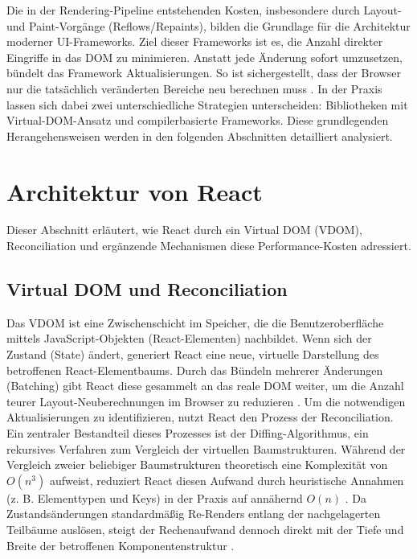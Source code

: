 Die in der Rendering-Pipeline entstehenden Kosten, insbesondere durch Layout- und Paint-Vorgänge (Reflows/Repaints), bilden die Grundlage für die Architektur moderner UI-Frameworks. Ziel dieser Frameworks ist es, die Anzahl direkter Eingriffe in das DOM zu minimieren. Anstatt jede Änderung sofort umzusetzen, bündelt das Framework Aktualisierungen. So ist sichergestellt, dass der Browser nur die tatsächlich veränderten Bereiche neu berechnen muss \cite{kumar-fluentreact-2024}. In der Praxis lassen sich dabei zwei unterschiedliche Strategien unterscheiden: Bibliotheken mit Virtual-DOM-Ansatz und compilerbasierte Frameworks. Diese grundlegenden Herangehensweisen werden in den folgenden Abschnitten detailliert analysiert.

\section{Architektur von React}
\label{s:react}

Dieser Abschnitt erläutert, wie React durch ein Virtual DOM (VDOM), Reconciliation und ergänzende Mechanismen diese Performance-Kosten adressiert.

\subsection{Virtual DOM und Reconciliation}
\label{ss:vdom}

Das VDOM ist eine Zwischenschicht im Speicher, die die Benutzeroberfläche mittels JavaScript-Objekten (React-Elementen) nachbildet. Wenn sich der Zustand (State) ändert, generiert React eine neue, virtuelle Darstellung des betroffenen React-Elementbaums. Durch das Bündeln mehrerer Änderungen (Batching) gibt React diese gesammelt an das reale DOM weiter, um die Anzahl teurer Layout-Neuberechnungen im Browser zu reduzieren \cite{kumar-fluentreact-2024}. Um die notwendigen Aktualisierungen zu identifizieren, nutzt React den Prozess der Reconciliation. Ein zentraler Bestandteil dieses Prozesses ist der Diffing-Algorithmus, ein rekursives Verfahren zum Vergleich der virtuellen Baumstrukturen. Während der Vergleich zweier beliebiger Baumstrukturen theoretisch eine Komplexität von $O(n^3)$ aufweist, reduziert React diesen Aufwand durch heuristische Annahmen (z. B. Elementtypen und Keys) in der Praxis auf annähernd $O(n)$ \cite{react_reconcillation_2024}. Da Zustandsänderungen standardmäßig Re-Renders entlang der nachgelagerten Teilbäume auslösen, steigt der Rechenaufwand dennoch direkt mit der Tiefe und Breite der betroffenen Komponentenstruktur \cite{kumar-fluentreact-2024}.


